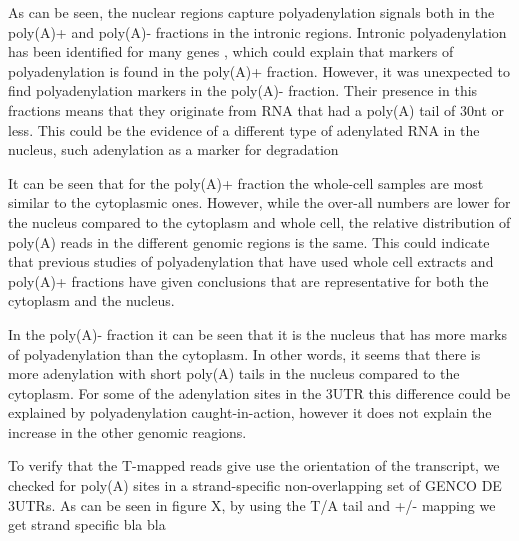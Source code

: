 \documentclass[a4paper]{article}
\begin{document}

As can be seen, the nuclear regions capture polyadenylation signals both in the
poly(A)+ and poly(A)- fractions in the intronic regions. Intronic
polyadenylation has been identified for many genes \cite{tian_widespread_2007},
which could explain that markers of polyadenylation is found in the poly(A)+
fraction.  However, it was unexpected to find polyadenylation markers in the
poly(A)- fraction. Their presence in this fractions means that they originate
from RNA that had a poly(A) tail of 30nt or less. This could be the
evidence of a different type of adenylated RNA in the nucleus, such adenylation
as a marker for degradation \cite{slomovic_addition_2010}

It can be seen that for the poly(A)+ fraction the whole-cell samples are most
similar to the cytoplasmic ones. However, while the over-all numbers are lower for
the nucleus compared to the cytoplasm and whole cell, the relative distribution of
poly(A) reads in the different genomic regions is the same. This could indicate that
previous studies of polyadenylation that have used whole cell extracts and
poly(A)+ fractions have given conclusions that are representative for both the
cytoplasm and the nucleus.

In the poly(A)- fraction it can be seen that it is the nucleus that has more
marks of polyadenylation than the cytoplasm. In other words, it seems that
there is more adenylation with short poly(A) tails in the nucleus compared to
the cytoplasm. For some of the adenylation sites in the 3UTR this difference
could be explained by polyadenylation caught-in-action, however it does not
explain the increase in the other genomic reagions.

To verify that the T-mapped reads give use the orientation of the transcript,
we checked for poly(A) sites in a strand-specific non-overlapping set of GENCO
DE 3UTRs. As can be seen in figure X, by using the T/A tail and +/- mapping we
get strand specific bla bla %
\end{document}

